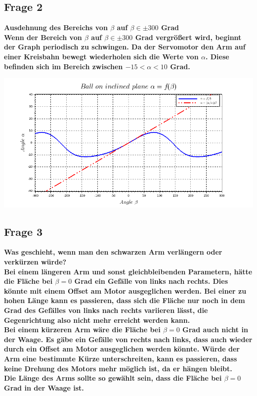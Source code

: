 \subsection{Frage 2}
\bfseries Ausdehnung des Bereichs von $\beta$ auf $\beta \in \pm 300$ Grad \\
\mdseries Wenn der Bereich von $\beta$ auf $\beta \in \pm300$ Grad vergrößert wird, beginnt der Graph periodisch zu schwingen. Da der Servomotor den Arm auf einer Kreisbahn bewegt wiederholen sich die Werte von $\alpha$. Diese befinden sich im Bereich zwischen $-15<\alpha<10$ Grad.\\
\begin{center}
	\begin{minipage}{\linewidth}
	\centering
	\includegraphics[scale=0.45]{images/plot2_1.png}
	\end{minipage}
\end{center}

\subsection{Frage 3}
\bfseries Was geschieht, wenn man den schwarzen Arm verlängern oder verkürzen würde? \\
\mdseries Bei einem längeren Arm und sonst gleichbleibenden Parametern, hätte die Fläche bei $\beta = 0$ Grad ein Gefälle von links nach rechts. Dies könnte mit einem Offset am Motor ausgeglichen werden. Bei einer zu hohen Länge kann es passieren, dass sich die Fläche nur noch in dem Grad des Gefälles von links nach rechts variieren lässt, die Gegenrichtung also nicht mehr erreicht werden kann. \\
Bei einem kürzeren Arm wäre die Fläche bei $\beta = 0$ Grad auch nicht in der Waage. Es gäbe ein Gefälle von rechts nach links, dass auch wieder durch ein Offset am Motor ausgeglichen werden könnte. Würde der Arm eine bestimmte Kürze unterschreiten, kann es passieren, dass keine Drehung des Motors mehr möglich ist, da er hängen bleibt. \\
Die Länge des Arms sollte so gewählt sein, dass die Fläche bei $\beta = 0$ Grad in der Waage ist.